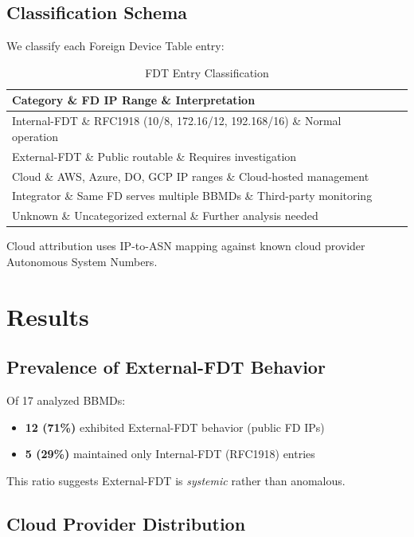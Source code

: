 \documentclass[11pt,a4paper]{article}
\begin{document}
\subsection{Classification Schema}

We classify each Foreign Device Table entry:

\begin{table}[h]
\centering
\begin{tabular}{lll}
\toprule
\textbf{Category} \& \textbf{FD IP Range} \& \textbf{Interpretation} \\
\midrule
Internal-FDT \& RFC1918 (10/8, 172.16/12, 192.168/16) \& Normal operation \\
External-FDT \& Public routable \& Requires investigation \\
\quad Cloud \& AWS, Azure, DO, GCP IP ranges \& Cloud-hosted management \\
\quad Integrator \& Same FD serves multiple BBMDs \& Third-party monitoring \\
\quad Unknown \& Uncategorized external \& Further analysis needed \\
\bottomrule
\end{tabular}
\caption{FDT Entry Classification}
\label{tab:classification}
\end{table}

Cloud attribution uses IP-to-ASN mapping against known cloud provider 
Autonomous System Numbers\cite{tank2017sok}.

\section{Results}
\label{sec:results}

\subsection{Prevalence of External-FDT Behavior}

Of 17 analyzed BBMDs:
\begin{itemize}
  \item \textbf{12 (71\%)} exhibited External-FDT behavior (public FD IPs)
  \item \textbf{5 (29\%)} maintained only Internal-FDT (RFC1918) entries
\end{itemize}

This ratio suggests External-FDT is \emph{systemic} rather than anomalous.

\subsection{Cloud Provider Distribution}
\end{document}
